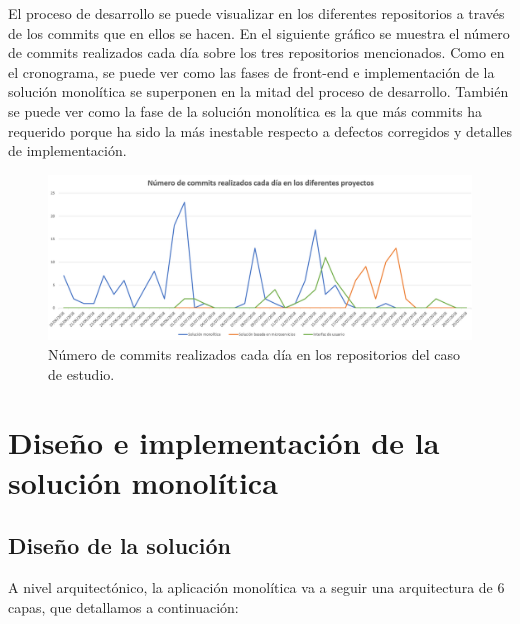 \documentclass[11pt,spanish,listoffigures]{tfgetsinf}
\begin{document}
\newpage


El proceso de desarrollo se puede visualizar en los diferentes repositorios a través de los commits que en ellos se hacen. En el siguiente gráfico se muestra el número de commits realizados cada día sobre los tres repositorios mencionados. Como en el cronograma, se puede ver como las fases de front-end e implementación de la solución monolítica se superponen en la mitad del proceso de desarrollo. También se puede ver como la fase de la solución monolítica es la que más commits ha requerido porque ha sido la más inestable respecto a defectos corregidos y detalles de implementación.

\begin{figure}[h]
\centering
\includegraphics[scale=0.5]{commits}
\caption{Número de commits realizados cada día en los repositorios del caso de estudio.}
\end{figure}

%

\chapter{Diseño e implementación de la solución monolítica}

\section{Diseño de la solución} \label{sct:DiseñoMonolitico}

A nivel arquitectónico, la aplicación monolítica va a seguir una arquitectura de 6 capas, que detallamos a continuación:
\end{document}
